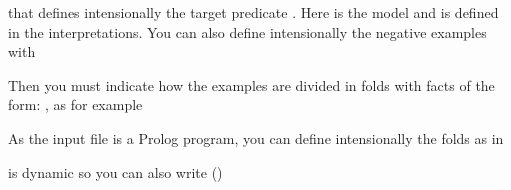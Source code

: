 \documentclass[letterpaper,10pt,english]{sphinxmanual}
\begin{document}
\sphinxAtStartPar
that defines intensionally the target predicate . Here  is the model and  is defined in the interpretations.
You can also define intensionally the negative examples with

\begin{sphinxVerbatim}[commandchars=\\\{\}]
 
 
\end{sphinxVerbatim}

\sphinxAtStartPar
Then you must indicate how the examples are divided in folds with facts of the form: , as for example

\begin{sphinxVerbatim}[commandchars=\\\{\}]
\PYG{p}{[}\PYG{p}{]}
\PYG{p}{[}\PYG{p}{]}
\end{sphinxVerbatim}

\sphinxAtStartPar
As the input file is a Prolog program, you can define intensionally the folds as in

\begin{sphinxVerbatim}[commandchars=\\\{\}]
\end{sphinxVerbatim}

\sphinxAtStartPar
{} is dynamic so you can also write ()
\end{document}
